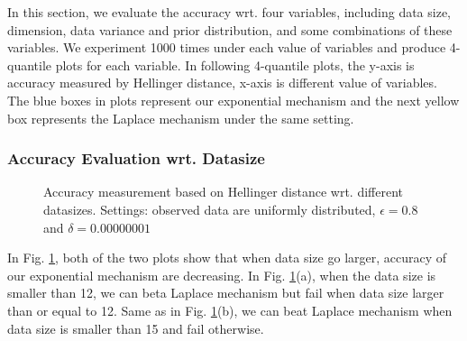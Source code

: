 \documentclass[sigconf, anonymous]{acmart}
\begin{document}
In this section, we evaluate the accuracy wrt. four variables, including data size, dimension, data variance and prior distribution, and some combinations of these variables. We experiment 1000 times under each value of variables and produce 4-quantile plots for each variable. In following 4-quantile plots, the y-axis is accuracy measured by Hellinger distance, x-axis is different value of variables. The blue boxes in plots represent our exponential mechanism and the next yellow box represents the Laplace mechanism under the same setting.

\subsubsection{Accuracy Evaluation wrt. Datasize}
\label{subsubsec_vs_datasize}

\begin{figure}[ht]
\begin{center}
\centering
\caption{Accuracy measurement based on Hellinger distance wrt. different datasizes. Settings: observed data are uniformly distributed, $\epsilon = 0.8$ and $\delta = 0.00000001$}
\label{fig_vs_datasize}
\end{center}
\end{figure}

In Fig. \ref{fig_vs_datasize}, both of the two plots show that when data size go larger, accuracy of our exponential mechanism are decreasing. In Fig. \ref{fig_vs_datasize}(a), when the data size is smaller than 12, we can beta Laplace mechanism but fail when data size larger than or equal to 12. Same as in Fig. \ref{fig_vs_datasize}(b), we can beat Laplace mechanism when data size is smaller than 15 and fail otherwise.
\end{document}
